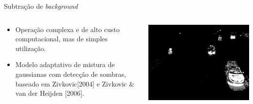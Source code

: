 \begin{frame}{Subtração de \textit{background}}
  \begin{columns}[T]
    \begin{column}{.5\textwidth}
      \begin{itemize}
        \item Operação complexa e de alto custo computacional, mas de simples utilização.
        \item Modelo adaptativo de mistura de gaussianas com detecção de sombras, baseado em Zivkovic[2004] e Zivkovic \& van der Heijden [2006].
      \end{itemize}
    \end{column}
    \begin{column}{.5\textwidth}
      \begin{block}{}
        \includegraphics[width=\textwidth]{imgs/foreground.png}
      \end{block}
    \end{column}
  \end{columns}
\end{frame}

